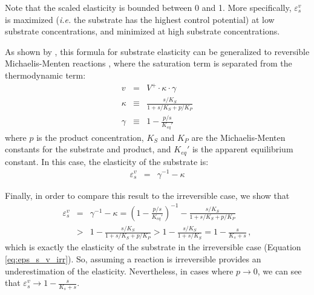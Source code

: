 \documentclass[12pt,a4paper]{article}
\begin{document}
Note that the scaled elasticity is bounded between 0 and 1. More specifically, $\varepsilon_s^v$ is maximized (\textit{i.e.} the substrate has the highest control potential) at low substrate concentrations, and minimized at high substrate concentrations.

As shown by \citet{Noor2013-vv}, this formula for substrate elasticity can be generalized to reversible Michaelis-Menten reactions \cite{Hofmeyr1995-fl, Rohwer2010-tx}, where the saturation term is separated from the thermodynamic term:
\begin{eqnarray}\label{eq:rev_mm}
    v &=& V^+ \cdot \kappa \cdot \gamma \nonumber\\
    \kappa &\equiv& \frac{s/K_S}{1 + s/K_S + p/K_P} \nonumber\\
    \gamma &\equiv& 1 - \frac{p/s}{K_{eq}'}
\end{eqnarray}
where $p$ is the product concentration, $K_S$ and $K_P$ are the Michaelis-Menten constants for the substrate and product, and $K_{eq}'$ is the apparent equilibrium constant. In this case, the elasticity of the substrate is:
\begin{eqnarray}
    \varepsilon_s^v &=& \gamma^{-1} - \kappa
\end{eqnarray}

Finally, in order to compare this result to the irreversible case, we show that
\begin{eqnarray}\label{eq:reversible_substrate_eps}
\varepsilon_{s}^v &=& \gamma^{-1} - \kappa = \left(1 - \frac{p/s}{K_{eq}'}\right)^{-1} - \frac{s/K_S}{1 + s/K_S + p/K_P} \nonumber\\
&>& 1 - \frac{s/K_S}{1 + s/K_S + p/K_P} > 1 - \frac{s/K_S}{1 + s/K_S} = 1 - \frac{s}{K_s + s}\,,
\end{eqnarray}
which is exactly the elasticity of the substrate in the irreversible case (Equation \ref{eq:eps_s_v_irr}). So, assuming a reaction is irreversible provides an underestimation of the elasticity. Nevertheless, in cases where $p \rightarrow 0$, we can see that $\varepsilon_{s}^v \rightarrow 1 - \frac{s}{K_s + s}$.
\end{document}
